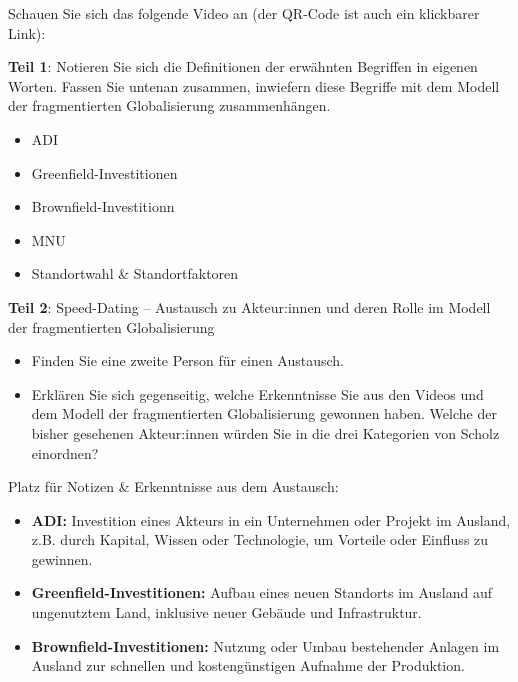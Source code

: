 \begin{myexercise}[ADI]
    Schauen Sie sich das folgende Video an (der QR-Code ist auch ein klickbarer Link):


    \textbf{Teil 1}: Notieren Sie sich die Definitionen der erwähnten Begriffen in eigenen Worten. Fassen Sie untenan zusammen, inwiefern diese Begriffe mit dem Modell der fragmentierten Globalisierung zusammenhängen.
    \begin{itemize}
        \item \gls{ADI}
        \item Greenfield-Investitionen
        \item Brownfield-Investitionn
        \item \gls{MNU}
        \item Standortwahl \& Standortfaktoren
    \end{itemize}
    \textbf{Teil 2}: Speed-Dating -- Austausch zu Akteur:innen und deren Rolle im Modell der fragmentierten Globalisierung

    \begin{itemize}
        \item Finden Sie eine zweite Person für einen Austausch.
        \item Erklären Sie sich gegenseitig, welche Erkenntnisse Sie aus den Videos und dem Modell der fragmentierten Globalisierung gewonnen haben. Welche der bisher gesehenen Akteur:innen würden Sie in die drei Kategorien von Scholz einordnen?
    \end{itemize}
    Platz für Notizen \& Erkenntnisse aus dem Austausch:

    \begin{myanswer}
        \begin{itemize}
            \item \textbf{\gls{ADI}:}
                  Investition eines Akteurs in ein Unternehmen oder Projekt im Ausland, z.B. durch Kapital, Wissen oder Technologie, um Vorteile oder Einfluss zu gewinnen.

            \item \textbf{Greenfield-Investitionen:}
                  Aufbau eines neuen Standorts im Ausland auf ungenutztem Land, inklusive neuer Gebäude und Infrastruktur.

            \item \textbf{Brownfield-Investitionen:}
                  Nutzung oder Umbau bestehender Anlagen im Ausland zur schnellen und kostengünstigen Aufnahme der Produktion.


\end{itemize}
\end{myanswer}
\end{myexercise}
